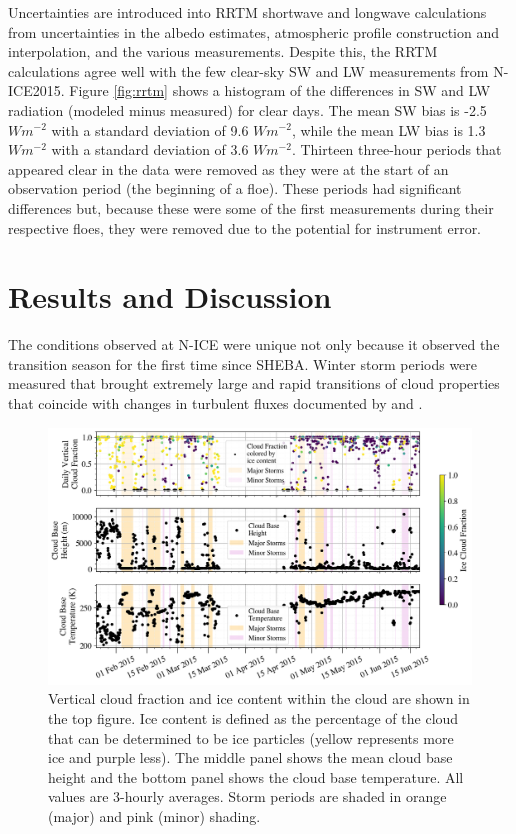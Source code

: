 Uncertainties are introduced into RRTM shortwave and longwave calculations from uncertainties in the albedo estimates, atmospheric profile construction and interpolation, and the various measurements. Despite this, the RRTM calculations agree well with the few clear-sky SW and LW measurements from N-ICE2015. Figure \ref{fig:rrtm} shows a histogram of the differences in SW and LW radiation (modeled minus measured) for clear days. The mean SW bias is -2.5 $W m^{-2}$ with a standard deviation of 9.6 $W m^{-2}$, while the mean LW bias is 1.3 $W m^{-2}$ with a standard deviation of 3.6 $W m^{-2}$. Thirteen three-hour periods that appeared clear in the data were removed as they were at the start of an observation period (the beginning of a floe). These periods had significant differences but, because these were some of the first measurements during their respective floes, they were removed due to the potential for instrument error.

\section{Results and Discussion}
The conditions observed at N-ICE were unique not only because it observed the transition season for the first time since SHEBA. Winter storm periods were measured that brought extremely large and rapid transitions of cloud properties that coincide with changes in turbulent fluxes documented by \citet{walden:2017} and \citet{graham:2017:comp}. 

\begin{figure}[t!]
    \centering
    \includegraphics[width=1\linewidth]{figures/chapter4/CloudSummary.png}
    \caption[Cloud fraction and phase, height, and temperature time series.]{Vertical cloud fraction and ice content within the cloud are shown in the top figure. Ice content is defined as the percentage of the cloud that can be determined to be ice particles (yellow represents more ice and purple less). The middle panel shows the mean cloud base height and the bottom panel shows the cloud base temperature. All values are 3-hourly averages. Storm periods are shaded in orange (major) and pink (minor) shading.}
    \label{fig:cloudmacro}
\end{figure}

